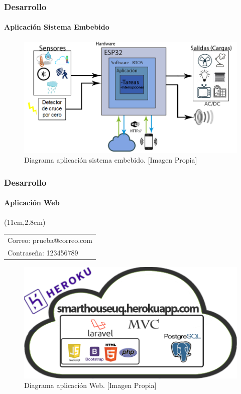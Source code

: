 \begin{frame}[t]
\frametitle{Desarrollo}
\framesubtitle{Aplicación Sistema Embebido}

\begin{figure}
	\centering
	\caption{Diagrama aplicación sistema embebido. [Imagen Propia]}
	\label{fig:baplicacion}
	\includegraphics[width=0.7\linewidth]{Imagenes/B_Aplicacion}
\end{figure}


\end{frame}

\begin{frame}[t]
\frametitle{Desarrollo}
\framesubtitle{Aplicación Web}

\begin{textblock*}{\linewidth}(11cm,2.8cm)	
		\begin{tabular}{|l|}
			\hline 
			Correo: prueba@correo.com\\
			Contraseña: 123456789\\ 
			\hline 
		\end{tabular} 
\end{textblock*}

\begin{figure}
	\centering
	\caption{Diagrama aplicación Web. [Imagen Propia]}
	\label{fig:bappweb}
	\includegraphics[width=0.7\linewidth]{Imagenes/B_ImplAPPweb}
\end{figure}

\end{frame}